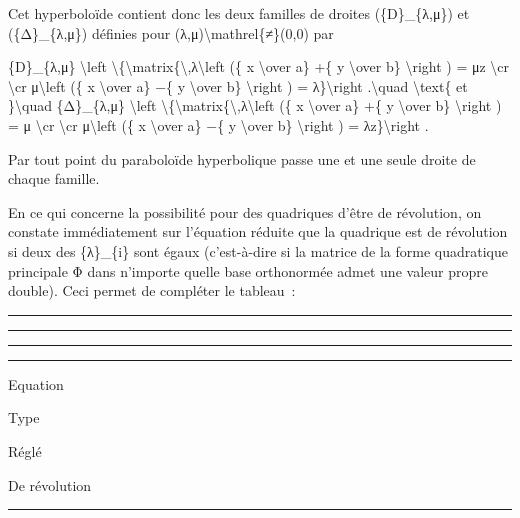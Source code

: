 \documentclass[]{article}
\begin{document}
Cet hyperboloïde contient donc les deux familles de droites
(\{D\}\_\{λ,μ\}) et (\{Δ\}\_\{λ,μ\}) définies pour
(λ,μ)\textbackslash{}mathrel\{≠\}(0,0) par

\{D\}\_\{λ,μ\} \textbackslash{}left
\textbackslash{}\{\textbackslash{}matrix\{\textbackslash{},λ\textbackslash{}left
(\{ x \textbackslash{}over a\} +\{ y \textbackslash{}over b\}
\textbackslash{}right ) = μz \textbackslash{}cr \textbackslash{}cr
μ\textbackslash{}left (\{ x \textbackslash{}over a\} −\{ y
\textbackslash{}over b\} \textbackslash{}right ) =
λ\}\textbackslash{}right .\textbackslash{}quad \textbackslash{}text\{ et
\}\textbackslash{}quad \{Δ\}\_\{λ,μ\} \textbackslash{}left
\textbackslash{}\{\textbackslash{}matrix\{\textbackslash{},λ\textbackslash{}left
(\{ x \textbackslash{}over a\} +\{ y \textbackslash{}over b\}
\textbackslash{}right ) = μ \textbackslash{}cr \textbackslash{}cr
μ\textbackslash{}left (\{ x \textbackslash{}over a\} −\{ y
\textbackslash{}over b\} \textbackslash{}right ) =
λz\}\textbackslash{}right .

Par tout point du paraboloïde hyperbolique passe une et une seule droite
de chaque famille.

En ce qui concerne la possibilité pour des quadriques d'être de
révolution, on constate immédiatement sur l'équation réduite que la
quadrique est de révolution si deux des \{λ\}\_\{i\} sont égaux
(c'est-à-dire si la matrice de la forme quadratique principale Φ dans
n'importe quelle base orthonormée admet une valeur propre double). Ceci
permet de compléter le tableau~:

\begin{center}\rule{3in}{0.4pt}\end{center}

\begin{center}\rule{3in}{0.4pt}\end{center}

\begin{center}\rule{3in}{0.4pt}\end{center}

\begin{center}\rule{3in}{0.4pt}\end{center}

Equation

Type

Réglé

De révolution

\begin{center}\rule{3in}{0.4pt}\end{center}
\end{document}
